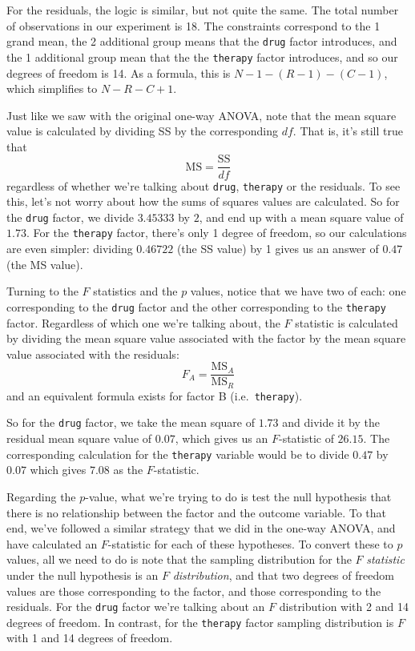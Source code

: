 \documentclass[
]{book}
\theoremstyle{definition}
\theoremstyle{definition}
\theoremstyle{definition}
\theoremstyle{definition}
\theoremstyle{remark}
\begin{document}
For the residuals, the logic is similar, but not quite the same. The total number of observations in our experiment is 18. The constraints correspond to the 1 grand mean, the 2 additional group means that the \texttt{drug} factor introduces, and the 1 additional group mean that the the \texttt{therapy} factor introduces, and so our degrees of freedom is 14. As a formula, this is \(N-1 -(R-1)-(C-1)\), which simplifies to \(N-R-C+1\).

Just like we saw with the original one-way ANOVA, note that the mean square value is calculated by dividing SS by the corresponding \(df\). That is, it's still true that
\[
\mbox{MS} = \frac{\mbox{SS}}{df}
\]
regardless of whether we're talking about \texttt{drug}, \texttt{therapy} or the residuals. To see this, let's not worry about how the sums of squares values are calculated. So for the \texttt{drug} factor, we divide \(3.45333\) by \(2\), and end up with a mean square value of \(1.73\). For the \texttt{therapy} factor, there's only 1 degree of freedom, so our calculations are even simpler: dividing \(0.46722\) (the SS value) by 1 gives us an answer of \(0.47\) (the MS value).

Turning to the \(F\) statistics and the \(p\) values, notice that we have two of each: one corresponding to the \texttt{drug} factor and the other corresponding to the \texttt{therapy} factor. Regardless of which one we're talking about, the \(F\) statistic is calculated by dividing the mean square value associated with the factor by the mean square value associated with the residuals:
\[
F_{A} = \frac{\mbox{MS}_{A}}{\mbox{MS}_{R}}
\]
and an equivalent formula exists for factor B (i.e.~\texttt{therapy}).

So for the \texttt{drug} factor, we take the mean square of \(1.73\) and divide it by the residual mean square value of \(0.07\), which gives us an \(F\)-statistic of \(26.15\). The corresponding calculation for the \texttt{therapy} variable would be to divide \(0.47\) by \(0.07\) which gives \(7.08\) as the \(F\)-statistic.

Regarding the \(p\)-value, what we're trying to do is test the null hypothesis that there is no relationship between the factor and the outcome variable. To that end, we've followed a similar strategy that we did in the one-way ANOVA, and have calculated an \(F\)-statistic for each of these hypotheses. To convert these to \(p\) values, all we need to do is note that the sampling distribution for the \(F\) \emph{statistic} under the null hypothesis is an \(F\) \emph{distribution}, and that two degrees of freedom values are those corresponding to the factor, and those corresponding to the residuals. For the \texttt{drug} factor we're talking about an \(F\) distribution with 2 and 14 degrees of freedom. In contrast, for the \texttt{therapy} factor sampling distribution is \(F\) with 1 and 14 degrees of freedom.
\end{document}
